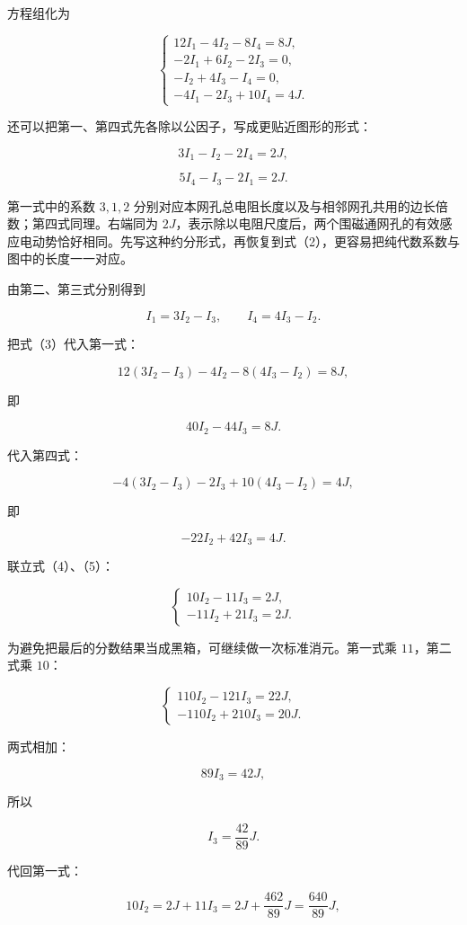 \documentclass[12pt,a4paper,UTF8]{ctexart}
\begin{document}
方程组化为

\[\begin{cases}
12I_1-4I_2-8I_4=8J,\\
-2I_1+6I_2-2I_3=0,\\
-I_2+4I_3-I_4=0,\\
-4I_1-2I_3+10I_4=4J.
\end{cases} \tag{2}\]

还可以把第一、第四式先各除以公因子，写成更贴近图形的形式：

\[3I_1-I_2-2I_4=2J,\]

\[5I_4-I_3-2I_1=2J.\]

第一式中的系数 \(3,1,2\)
分别对应本网孔总电阻长度以及与相邻网孔共用的边长倍数；第四式同理。右端同为
\(2J\)，表示除以电阻尺度后，两个围磁通网孔的有效感应电动势恰好相同。先写这种约分形式，再恢复到式（2），更容易把纯代数系数与图中的长度一一对应。

由第二、第三式分别得到

\[I_1=3I_2-I_3,\qquad I_4=4I_3-I_2. \tag{3}\]

把式（3）代入第一式：

\[12(3I_2-I_3)-4I_2-8(4I_3-I_2)=8J,\]

即

\[40I_2-44I_3=8J. \tag{4}\]

代入第四式：

\[-4(3I_2-I_3)-2I_3+10(4I_3-I_2)=4J,\]

即

\[-22I_2+42I_3=4J. \tag{5}\]

联立式（4）、（5）：

\[\begin{cases}
10I_2-11I_3=2J,\\
-11I_2+21I_3=2J.
\end{cases}\]

为避免把最后的分数结果当成黑箱，可继续做一次标准消元。第一式乘
\(11\)，第二式乘 \(10\)：

\[\begin{cases}
110I_2-121I_3=22J,\\
-110I_2+210I_3=20J.
\end{cases}\]

两式相加：

\[89I_3=42J,\]

所以

\[I_3=\frac{42}{89}J.\]

代回第一式：

\[10I_2=2J+11I_3
=2J+\frac{462}{89}J
=\frac{640}{89}J,\]
\end{document}
